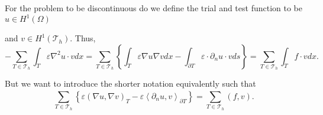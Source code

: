 For the problem to be discontinuous do we define the trial and test function to be $u \in H^{1 }\left( \Omega  \right) $

and $v \in H^{1 } \left( \mathcal{T} _{h} \right)$. Thus,
\begin{equation}
\label{eq:1a}
- \sum_{T \in \mathcal{T} _{h}}^{} \int_{ T}^{}   \varepsilon \nabla ^2 u \cdot v dx = \sum_{T \in \mathcal{T}_{h} }^{}
\left\{ \int_{T}^{} \varepsilon \nabla u \nabla v dx - \int_{\partial T}^{} \varepsilon\cdot  \partial _{n} u \cdot v ds
\right\} = \sum_{T \in \mathcal{T} _{h}}^{}  \int_{T}^{} f\cdot v dx
.\end{equation}

But we want to introduce the shorter notation equivalently such that
\begin{equation}
\label{eq:1b}
   \sum_{T \in \mathcal{T} _{h}}^{}
     \left\{ \varepsilon\left( \nabla u, \nabla v \right) _{T} -\varepsilon \left<\partial _{n} u,v \right>_{\partial T} \right\} = \sum_{T \in
  \mathcal{T} _{h}}^{}  \left( f,v \right)
.\end{equation}

